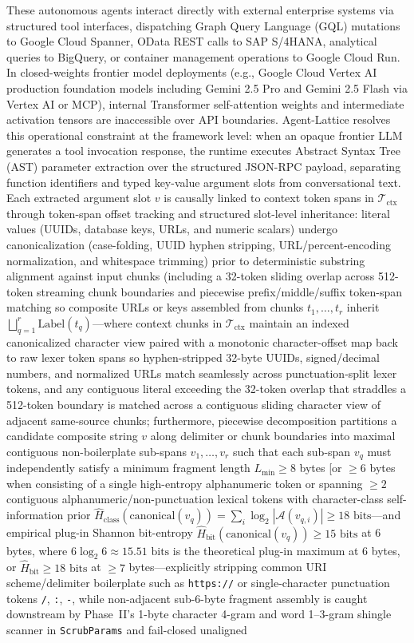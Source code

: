 \documentclass[conference,10pt]{IEEEtran}
\begin{document}
These autonomous agents interact directly with external enterprise systems via structured tool interfaces, dispatching Graph Query Language (GQL) mutations to Google Cloud Spanner, OData REST calls to SAP S/4HANA, analytical queries to BigQuery, or container management operations to Google Cloud Run. In closed-weights frontier model deployments (e.g., Google Cloud Vertex AI production foundation models including Gemini 2.5 Pro and Gemini 2.5 Flash via Vertex AI or MCP), internal Transformer self-attention weights and intermediate activation tensors are inaccessible over API boundaries. Agent-Lattice resolves this operational constraint at the framework level: when an opaque frontier LLM generates a tool invocation response, the runtime executes Abstract Syntax Tree (AST) parameter extraction over the structured JSON-RPC payload, separating function identifiers and typed key-value argument slots from conversational text. Each extracted argument slot $v$ is causally linked to context token spans in $\mathcal{T}_{\text{ctx}}$ through token-span offset tracking and structured slot-level inheritance: literal values (UUIDs, database keys, URLs, and numeric scalars) undergo canonicalization (case-folding, UUID hyphen stripping, URL/percent-encoding normalization, and whitespace trimming) prior to deterministic substring alignment against input chunks (including a 32-token sliding overlap across 512-token streaming chunk boundaries and piecewise prefix/middle/suffix token-span matching so composite URLs or keys assembled from chunks $t_1, \dots, t_r$ inherit $\bigsqcup_{q=1}^r \text{Label}(t_q)$---where context chunks in $\mathcal{T}_{\text{ctx}}$ maintain an indexed canonicalized character view paired with a monotonic character-offset map back to raw lexer token spans so hyphen-stripped 32-byte UUIDs, signed/decimal numbers, and normalized URLs match seamlessly across punctuation-split lexer tokens, and any contiguous literal exceeding the 32-token overlap that straddles a 512-token boundary is matched across a contiguous sliding character view of adjacent same-source chunks; furthermore, piecewise decomposition partitions a candidate composite string $v$ along delimiter or chunk boundaries into maximal contiguous non-boilerplate sub-spans $v_1, \dots, v_r$ such that each sub-span $v_q$ must independently satisfy a minimum fragment length $L_{\min} \ge 8$ bytes [or $\ge 6$ bytes when consisting of a single high-entropy alphanumeric token or spanning $\ge 2$ contiguous alphanumeric/non-punctuation lexical tokens with character-class self-information prior $\hat{H}_{\text{class}}(\text{canonical}(v_q)) = \sum_i \log_2 |\mathcal{A}(v_{q,i})| \ge 18\text{ bits}$---and empirical plug-in Shannon bit-entropy $\hat{H}_{\text{bit}}(\text{canonical}(v_q)) \ge 15\text{ bits}$ at 6 bytes, where $6 \log_2 6 \approx 15.51\text{ bits}$ is the theoretical plug-in maximum at 6 bytes, or $\hat{H}_{\text{bit}} \ge 18\text{ bits}$ at $\ge 7$ bytes---explicitly stripping common URI scheme/delimiter boilerplate such as \texttt{https://} or single-character punctuation tokens \texttt{/}, \texttt{:}, \texttt{-}, while non-adjacent sub-6-byte fragment assembly is caught downstream by Phase~II's 1-byte character 4-gram and word 1--3-gram shingle scanner in \texttt{ScrubParams} and fail-closed unaligned 
\end{document}
